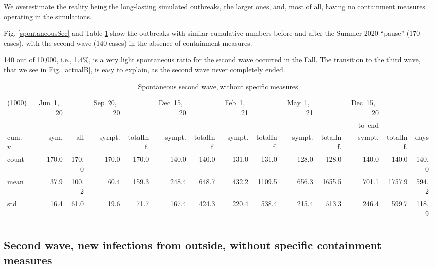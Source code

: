\documentclass[graybox]{svmult}
\begin{document}
We overestimate the reality being the long-lasting simulated outbreaks, the larger ones, and, most of all, having no containment measures operating in the simulations.

Fig. \ref{spontaneousSec} and Table \ref{selSpontWave2Tab} show the outbreaks with similar cumulative numbers before and after the Summer 2020 ``pause'' (170 cases), with the second wave (140 cases) in the absence of containment measures.

140 out of 10,000, i.e., 1.4\%, is a very light spontaneous ratio for the second wave occurred in the Fall. The transition to the third wave, that we see in Fig. \ref{actualB}, is easy to explain, as the second wave never completely ended.

\begin{table}[t]
\center
\tiny
\begin{tabular}{lrrrrrrrrrrrrr}
\hline\noalign{\smallskip}
(1000) & Jun~1,~20 & & Sep~20,~20 & & Dec~15,~20 & & Feb~1,~21 & & May~1,~21 & & Dec~15,~20 \\
& & & & & & & & & & & to~end \\
cum.~v. & sym. & all & sympt. & totalInf. & sympt. & totalInf. & sympt. & totalInf. & sympt. & totalInf. & sympt. & totalInf. & days\\
\noalign{\smallskip}\svhline\noalign{\smallskip}
count & 170.0 & 170.0 & 170.0 & 170.0 & 140.0 & 140.0 & 131.0 & 131.0 & 128.0 & 128.0 & 140.0 & 140.0 & 140.0 \\
mean & 37.9 & 100.2 & 60.4 & 159.3 & 248.4 & 648.7 & 432.2 & 1109.5 & 656.3 & 1655.5 & 701.1 & 1757.9 & 594.2 \\
std & 16.4 & 61.0 & 19.6 & 71.7 & 167.4 & 424.3 & 220.4 & 538.4 & 215.4 & 513.3 & 246.4 & 599.7 & 118.9 \\
\hline\noalign{\smallskip}
\end{tabular}
\caption{Spontaneous second wave, without specific measures}
\label{selSpontWave2Tab}
\end{table}

\subsection{Second wave, new infections from outside, without specific containment measures}
\label{secondWithout}
\end{document}
